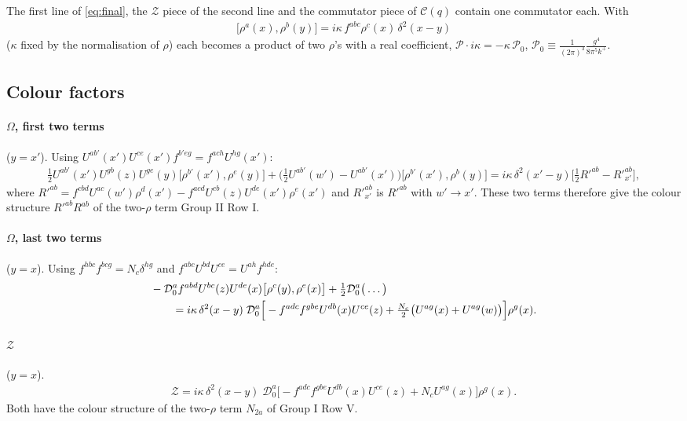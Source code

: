 \documentclass[10pt]{article}
\numberwithin{equation}{section}
\begin{document}
The first line of \eqref{eq:final}, the $\mathcal{Z}$ piece of the second line and the commutator piece of $\mathcal{C}(q)$ contain one commutator each. With
\begin{align}
\big[\rho^{a}(x),\rho^{b}(y)\big]=i\kappa\,f^{abc}\rho^{c}(x)\,\delta^{2}(x-y)
\end{align}
($\kappa$ fixed by the normalisation of $\rho$) each becomes a product of two $\rho$'s with a real coefficient, $\mathcal{P}\cdot i\kappa=-\kappa\,\mathcal{P}_{0}$, $\mathcal{P}_{0}\equiv\frac{1}{(2\pi)^{3}}\frac{g^{4}}{8\pi^{5}k^{+}}$.

\subsection{Colour factors}
\paragraph{$\Omega$, first two terms} ($y=x'$). Using $U^{ab'}(x')U^{ce}(x')f^{b'eg}=f^{ach}U^{hg}(x')$:
\begin{align}
\tfrac12U^{ab'}(x')U^{gb}(z)U^{ge}(y)\big[\rho^{b'}(x'),\rho^{e}(y)\big]+\Big(\tfrac12U^{ab'}(w')-U^{ab'}(x')\Big)\big[\rho^{b'}(x'),\rho^{b}(y)\big]
=i\kappa\,\delta^{2}(x'-y)\Big[\tfrac12R'^{ab}-R'^{ab}_{x'}\Big],
\end{align}
where $R'^{ab}=f^{cbd}U^{ac}(w')\rho^{d}(x')-f^{acd}U^{cb}(z)U^{de}(x')\rho^{e}(x')$ and $R'^{ab}_{x'}$ is $R'^{ab}$ with $w'\to x'$. These two terms therefore give the colour structure $R'^{ab}R^{ab}$ of the two-$\rho$ term Group II Row I.
\paragraph{$\Omega$, last two terms} ($y=x$). Using $f^{hbc}f^{bcg}=N_{c}\delta^{hg}$ and $f^{abc}U^{bd}U^{ce}=U^{ah}f^{hde}$:
\begin{align}
&-\mathcal{D}_{0}^{a}f^{abd}U^{bc}(z)U^{de}(x)\big[\rho^{c}(y),\rho^{e}(x)\big]+\tfrac12\mathcal{D}_{0}^{a}\big(\dots\big)\notag\\
&\qquad=i\kappa\,\delta^{2}(x-y)\;\mathcal{D}_{0}^{a}\Big[-f^{adc}f^{gbe}U^{db}(x)U^{ce}(z)+\tfrac{N_{c}}{2}\big(U^{ag}(x)+U^{ag}(w)\big)\Big]\rho^{g}(x).
\end{align}
\paragraph{$\mathcal{Z}$} ($y=x$).
\begin{align}
\mathcal{Z}=i\kappa\,\delta^{2}(x-y)\;\mathcal{D}_{0}^{a}\Big[-f^{adc}f^{gbe}U^{db}(x)U^{ce}(z)+N_{c}U^{ag}(x)\Big]\rho^{g}(x).
\end{align}
Both have the colour structure of the two-$\rho$ term $N_{2a}$ of Group I Row V.
\end{document}
